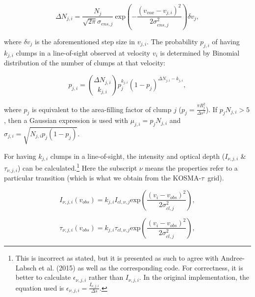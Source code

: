 \documentclass[a4paper]{article}
\newcommand{\kosmatau}{KOSMA-\(\tau\)}
\begin{document}
    \begin{equation}
    \label{delta Nji}
    \Delta N_{j,i} = \frac{N_j}{\sqrt{2 \pi} \sigma_{ens,j}} \ \mathrm{exp} \left( -\frac{(v_{vox}-v_{j,i})^2}{2 \sigma_{ens, j}^2} \right) \delta v_j,
    \end{equation}

    where \(\delta v_j\) is the aforementioned step size in \(v_{j,i}\).
    The probability \(p_{j,i}\) of having \(k_{j,i}\) clumps in a line-of-sight observed at velocity \(v_i\) is determined by Binomial distribution of the number of clumps at that velocity:

    \begin{equation}
    \label{combination probability}
    p_{j,i} = \binom{\Delta N_{j,i}}{k_{j,i}} p_j^{k_{j,i}} (1-p_j)^{\Delta N_{j,i}-k_{j,i}},
    \end{equation}

    where \(p_j\) is equivalent to the area-filling factor of clump \(j\) (\(p_j = \frac{\pi R_{j}^2}{\Delta s^2}\)).
    If \(p_j N_{j,i}>5\), then a Gaussian expression is used with \(\mu_{j,i} = p_j N_{j,i}\) and \(\sigma_{j,i} = \sqrt{N_{j,i} p_j (1-p_j)}\).

    For having \(k_{j,i}\) clumps in a line-of-sight, the intensity and optical depth (\(I_{\nu,j,i}\) \& \(\tau_{\nu,j,i}\)) can be calculated.\footnote{
        This is incorrect as stated, but it is presented as such to agree with Andree-Labsch et al. (2015) as well as the corresponding code. For correctness, it is better to calculate \(\epsilon_{\nu,j,i}\) rather than \(I_{\nu,j,i}\). In the original implementation, the equation used is \(\epsilon_{\nu,j,i} = \frac{I_{\nu,j,i}}{\Delta s}\).}
    Here the subscript \(\nu\) means the properties refer to a particular transition (which is what we obtain from the \kosmatau \ grid).

    \begin{equation}
    \label{los intensity}
    I_{\nu,j,i} (v_{obs}) = k_{j,i} I_{cl,\nu,j} \mathrm{exp} \left( \frac{(v_i-v_{obs})^2}{2\sigma_{cl, j}^2} \right),
    \end{equation}

    \begin{equation}
    \label{los optical depth}
    \tau_{\nu,j,i} (v_{obs}) = k_{j,i} \tau_{cl,\nu,j} \mathrm{exp} \left( \frac{(v_i-v_{obs})^2}{2\sigma_{cl, j}^2} \right),
    \end{equation}
\end{document}

